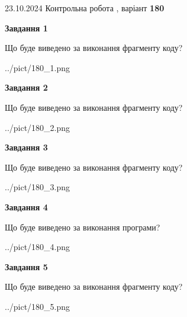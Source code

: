 \documentclass[12pt, ukrainian]{article}
\begin{document}
{\Large{23.10.2024 Контрольна робота , варіант  \No \textbf { 180 }\par}}
{
\begin {large}
{\begin {center}\textbf{Завдання 1}\end {center}}

Що буде виведено за виконання фрагменту коду?\par
\begin{center}
	{../pict/180_1.png}
\end{center}
\newpage

{\begin {center}\textbf{Завдання 2}\end {center}}

Що буде виведено за виконання фрагменту коду?\par
\begin{center}
	{../pict/180_2.png}
\end{center}
\newpage

{\begin {center}\textbf{Завдання 3}\end {center}}

Що буде виведено за виконання фрагменту коду?\par
\begin{center}
	{../pict/180_3.png}
\end{center}
\newpage

{\begin {center}\textbf{Завдання 4}\end {center}}

Що буде виведено за виконання програми?\par
\begin{center}
	{../pict/180_4.png}
\end{center}
\newpage

{\begin {center}\textbf{Завдання 5}\end {center}}

Що буде виведено за виконання фрагменту коду?\par
\begin{center}
	{../pict/180_5.png}
\end{center}
\newpage


\end{large}}
\end{document}
